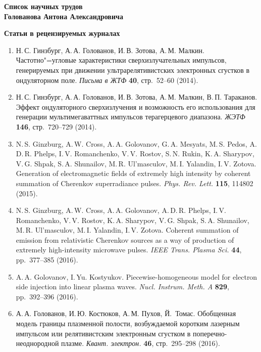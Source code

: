 \documentclass[12pt,a4paper]{scrartcl}
\begin{document}
\begin{center}
    \bfseries
    \large
    Список научных трудов \\
    Голованова Антона Александровича
\end{center}

\sloppy

\noindent\textbf{Статьи в рецензируемых журналах}

\begin{enumerate}[parsep=0em, itemsep=0.3em]
\item{ Н.\,С. Гинзбург, А.\,А. Голованов, И.\,В. Зотова, А.\,М. Малкин. Частотно"=угловые характеристики сверхизлучательных импульсов, генерируемых при движении ультрарелятивистских электронных сгустков в ондуляторном поле. \textit{Письма в ЖТФ} \textbf{40}, стр.~52--60 (2014).}
\item{ Н.\,С. Гинзбург, А.\,А. Голованов, И.\,В. Зотова, А.\,М. Малкин, В.\,П. Тараканов. Эффект ондуляторного сверхизлучения и возможность его использования для генерации мультимегаваттных импульсов терагерцевого диапазона. \textit{ЖЭТФ} \textbf{146}, стр.~720--729 (2014).}
\item{N.\,S. Ginzburg, A.\,W. Cross, A.\,A. Golovanov, G.\,A. Mesyats, M.\,S. Pedos, A.\,D.\,R. Phelps, I.\,V. Romanchenko, V.\,V. Rostov, S.\,N. Rukin, K.\,A. Sharypov, V.\,G. Shpak, S.\,A. Shunailov, M.\,R. Ul'masculov, M.\,I. Yalandin, I.\,V. Zotova. Generation of electromagnetic fields of extremely high intensity by coherent summation of Cherenkov superradiance pulses. \textit{Phys. Rev. Lett.} \textbf{115}, 114802 (2015).}
\item{N.\,S. Ginzburg, A.\,W. Cross, A.\,A. Golovanov, A.\,D.\,R. Phelps, I.\,V. Romanchenko, V.\,V. Rostov, K.\,A. Sharypov, V.\,G. Shpak, S.\,A. Shunailov, M.\,R. Ul'masculov, M.\,I. Yalandin, I.\,V. Zotova. Coherent summation of emission from relativistic Cherenkov sources as a way of production of extremely high-intensity microwave pulses. \textit{IEEE Trans. Plasma Sci.} \textbf{44}, pp.~377--385 (2016).}
\item{A.\,A. Golovanov, I.\,Yu. Kostyukov. Piecewise-homogeneous model for electron side injection into linear plasma waves. \textit{Nucl. Instrum. Meth. A} \textbf{829}, pp.~392--396 (2016).}
\item{ А.\,А. Голованов, И.\,Ю. Костюков, А.\,М. Пухов, Й.~Томас. Обобщенная модель границы плазменной полости, возбуждаемой коротким лазерным импульсом или релятивистским электронным сгустком в поперечно-неоднородной плазме. \textit{Квант. электрон.} \textbf{46}, стр.~295--298 (2016).}

\end{enumerate}
\end{document}
